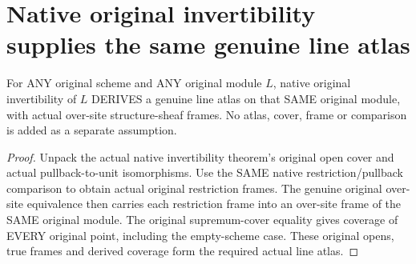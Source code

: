 \section{Native original invertibility supplies the same genuine line atlas}
\label{sec:invertible-line-atlas}

\begin{definition}
\label{sc0-native-line-atlas:actual-over-atlas}
\leanok
For ANY original scheme and ANY original module $L$, native original
invertibility of $L$ DERIVES a genuine line atlas on that SAME original
module, with actual over-site structure-sheaf frames. No atlas, cover,
frame or comparison is added as a separate assumption.
\end{definition}
\begin{proof}
Unpack the actual native invertibility theorem's original open cover and
actual pullback-to-unit isomorphisms. Use the SAME native
restriction/pullback comparison to obtain actual original restriction
frames. The genuine original over-site equivalence then carries each
restriction frame into an over-site frame of the SAME original module.
The original supremum-cover equality gives coverage of EVERY original
point, including the empty-scheme case. These original opens, true
frames and derived coverage form the required actual line atlas.
\end{proof}
